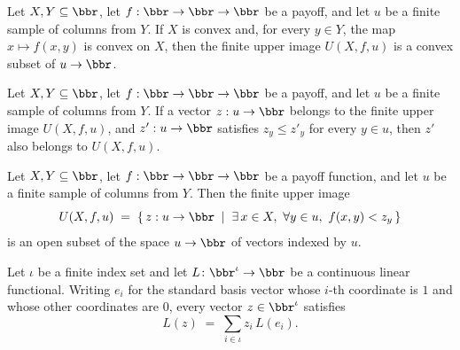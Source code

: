 \begin{lemma}
\label{OnlineLearning.finiteUpperImage_convex}
\leanok
{}
Let $X, Y \subseteq \bbr$, let $f : \bbr \to \bbr \to \bbr$ be a payoff, and let $u$ be
a finite sample of columns from $Y$. If $X$ is convex and, for every $y \in Y$, the map
$x \mapsto f(x,y)$ is convex on $X$, then the finite upper image $U(X,f,u)$ is a convex
subset of $u \to \bbr$.
\end{lemma}

\begin{lemma}
\label{OnlineLearning.finiteUpperImage_upper}
\leanok
{}
Let $X, Y \subseteq \bbr$, let $f : \bbr \to \bbr \to \bbr$ be a payoff, and let $u$ be
a finite sample of columns from $Y$. If a vector $z : u \to \bbr$ belongs to the finite
upper image $U(X,f,u)$, and $z' : u \to \bbr$ satisfies $z_y \le z'_y$ for every $y \in
u$, then $z'$ also belongs to $U(X,f,u)$.
\end{lemma}

\begin{lemma}
\label{OnlineLearning.finiteUpperImage_isOpen}
\leanok
{}
Let $X, Y \subseteq \bbr$, let $f : \bbr \to \bbr \to \bbr$ be a payoff function, and
let $u$ be a finite sample of columns from $Y$. Then the finite upper image
\[
U(X,f,u) \;=\; \{\, z : u \to \bbr \;\mid\; \exists\, x \in X,\ \forall y \in u,\ f(x,y)
< z_y \,\}
\]
is an open subset of the space $u \to \bbr$ of vectors indexed by $u$.
\end{lemma}

\begin{lemma}
\label{OnlineLearning.continuousLinearMap_pi_apply_eq_sum_single}
\leanok
{}
Let $\iota$ be a finite index set and let $L \colon \bbr^{\iota} \to \bbr$ be a
continuous linear functional. Writing $e_i$ for the standard basis vector whose $i$-th
coordinate is $1$ and whose other coordinates are $0$, every vector $z \in \bbr^{\iota}$
satisfies
\[
  L(z) \;=\; \sum_{i \in \iota} z_i \, L(e_i).
\]
\end{lemma}

